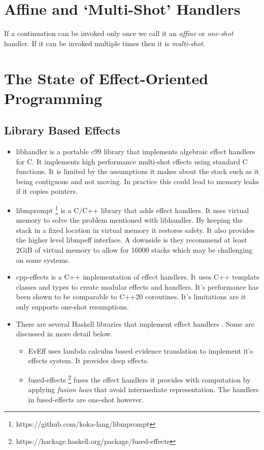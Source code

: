 \documentclass[logo,bsc,singlespacing,parskip]{infthesis}
\begin{document}
\section{Affine and `Multi-Shot' Handlers}

If a continuation can be invoked only once we call it an \emph{affine} or
\emph{one-shot} handler.  If it can be invoked multiple times then it is
\emph{multi-shot}.

\section{The State of Effect-Oriented Programming}

\subsection{Library Based Effects}

\begin{itemize}
        \item{libhandler \cite{leijen2017implementing} is a portable c99 library
that implements algebraic effect handlers for C. It implements high performance
multi-shot effects using standard C functions. It is limited by the assumptions
it makes about the stack such as it being contiguous and not moving. In practice
this could lead to memory leaks if it copies pointers.}
        \item{libmprompt \footnote{https://github.com/koka-lang/libmprompt} is a
C/C++ library that adds effect handlers. It uses virtual memory to solve the
problem mentioned with libhandler. By keeping the stack in a fixed location in
virtual memory it restores safety. It also provides the higher level libmpeff
interface. A downside is they recommend at least 2GiB of virtual memory to
allow for 16000 stacks which may be challenging on some systems.}
        \item{cpp-effects \cite{DBLP:journals/pacmpl/GhicaLBP22} is a C++
implementation of effect handlers. It uses C++ template classes and types to
create modular effects and handlers. It's performance has been shown to be
comparable to C++20 coroutines. It's limitations are it only supports one-shot
        resumptions.}
        \item{There are several Haskell libraries that implement effect handlers
\cite{DBLP:conf/haskell/XieL20, DBLP:conf/haskell/KiselyovI15,
DBLP:conf/haskell/WuSH14}. Some are discussed in more detail below.}
        \begin{itemize}
          \item{EvEff uses lambda calculus based evidence translation to
implement it's effects system. It provides deep effects.}
          \item{fused-effects
\footnote{https://hackage.haskell.org/package/fused-effects} fuses the effect
handlers it provides with computation by applying \emph{fusion laws} that avoid
intermediate representation. The handlers in fused-effects are one-shot
however.}
        \end{itemize}
\end{itemize}
\end{document}
